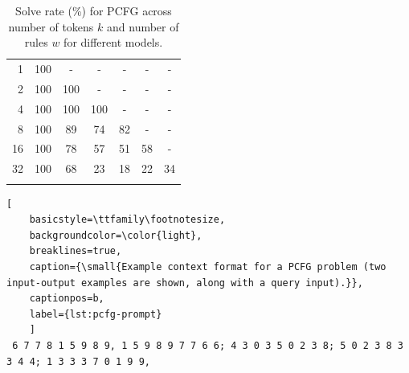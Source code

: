 \documentclass{article}
\begin{document}
\begin{table}[h]
{\begin{tabular}{@{}rcccccc@{}}
    \midrule
    1&100&-&-&-&-&- \\
    2&100&100&-&-&-&- \\
    4&100&100&100&-&-&- \\
    8&100&89&74&82&-&- \\
    16&100&78&57&51&58&- \\
    32&100&68&23&18&22&34 \\
    \bottomrule
    \vspace{-0.5em}
    \end{tabular}
    \vspace{-1.0em}
    \caption{
    \small
    Solve rate (\%) for PCFG across number of tokens $k$ and number of rules $w$ for different models.
    }
    \label{tab:pcfg-results-kw}
}
\end{table}
\begin{lstlisting}[
    basicstyle=\ttfamily\footnotesize,
    backgroundcolor=\color{light},
    breaklines=true,
    caption={\small{Example context format for a PCFG problem (two input-output examples are shown, along with a query input).}},
    captionpos=b,
    label={lst:pcfg-prompt}
    ]
 6 7 7 8 1 5 9 8 9, 1 5 9 8 9 7 7 6 6; 4 3 0 3 5 0 2 3 8; 5 0 2 3 8 3 3 4 4; 1 3 3 3 7 0 1 9 9,
\end{lstlisting}
\end{document}

